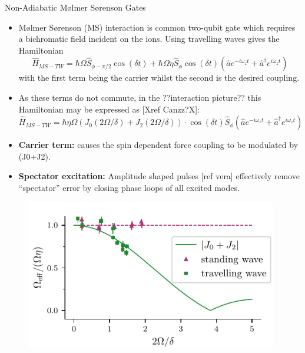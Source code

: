 \documentclass[final]{beamer}
\begin{document}
\begin{frame}{}
\begin{center}
\begin{columns}[t]
\begin{column}{0.49\textwidth}
\begin{alertblock}{Non-Adiabatic Mølmer Sørenson Gates}
\begin{itemize}
      \item Mølmer Sørenson (MS) interaction is common two-qubit gate which requires a
      bichromatic field incident on the ions. Using travelling
      waves gives the Hamiltonian
      \Large$$ \hat{H}_{MS-TW} = \hbar\Omega \hat{S}_{\phi-\pi/2}\cos{(\delta t)} + \hbar\Omega\eta \hat{S}_\phi\cos{(\delta t)}(\hat{a}e^{-i\omega_zt} + \hat{a}^\dagger e^{i\omega_zt})$$\normalsize
      \vspace{0.4em}
      with the first term being the carrier whilst the second is the desired coupling.\vspace{0.8em} 

      \item As these terms do not commute, in the ??interaction picture?? this Hamiltonian
            may be expressed as [Xref Canzz?X]:
      \Large$$ \hat{H}_{MS-TW} = \hbar\eta\Omega(J_0(2\Omega/\delta) + J_2(2\Omega/\delta))\cdot \cos{(\delta t)}\hat{S}_{\phi}(\hat{a}e^{-i\omega_zt} + \hat{a}^\dagger e^{i\omega_zt})$$\normalsize
      \end{itemize}
      \begin{minipage}{0.58\textwidth}
      \begin{itemize}
      \item \textbf{Carrier term:} causes the spin dependent force
        coupling to be modulated by (J0+J2).

      \item \textbf{Spectator excitation:} Amplitude shaped pulses
        [ref vera] effectively remove ``spectator'' error by closing
        phase loops of all excited modes.
        
      \end{itemize}
      \end{minipage}
      \begin{minipage}{0.38\textwidth}
      \begin{figure}
        \includegraphics[width=0.98\textwidth]{./figs/J0J2.pdf}
      \end{figure}
      \end{minipage}


\end{alertblock}
\end{column}
\end{columns}
\end{center}
\end{frame}
\end{document}
